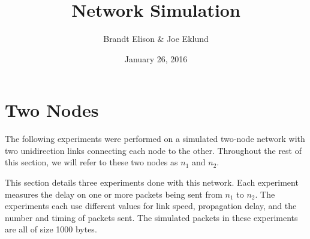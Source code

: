\documentclass[11pt]{article}
\begin{document}
\lstset{
  language=Python,
  basicstyle=\small,          %
  keywordstyle=\bfseries,
  identifierstyle=,           %
  commentstyle=,              %
  stringstyle=\ttfamily,      %
  showstringspaces=false,     %
  numbers=left,
  numberstyle=\tiny,
  numbersep=5pt,
  frame=tb,
}

\title{Network Simulation}

\author{Brandt Elison & Joe Eklund}

\date{January 26, 2016}

\maketitle

\section{Two Nodes}

The following experiments were performed on a simulated two-node network with two unidirection links connecting each node to the other. Throughout the rest of this section, we will refer to these two nodes as $n_1$ and $n_2$.

This section details three experiments done with this network. Each experiment measures the delay on one or more packets being sent from $n_1$ to $n_2$. The experiments each use different values for link speed, propagation delay, and the number and timing of packets sent. The simulated packets in these experiments are all of size 1000 bytes.
\end{document}
